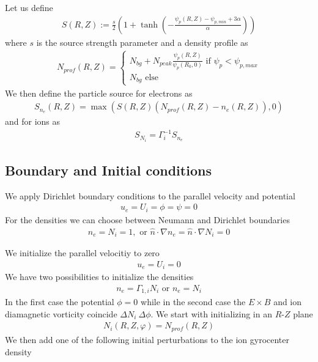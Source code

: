 \documentclass{hitec} %
\begin{document}
Let us define
\begin{align}
  S(R,Z) := \frac{s}{2}\left( 1 + \tanh\left( - \frac{\psi_p(R,Z) - \psi_{p,min} + 3\alpha}{\alpha} \right) \right)
  \label{}
\end{align}
where $s$ is the source strength parameter
and a density profile as
\begin{align}
  N_{prof}(R,Z)=\begin{cases}
    N_{bg} + N_{peak}\frac{\psi_p(R,Z)} {\psi_p(R_0, 0)} \text{ if }\psi_p < \psi_{p,max} \\
    N_{bg} \text{ else }
  \end{cases}
  \label{}
\end{align}
We then define the particle source for electrons as
\begin{align}
  S_{n_e}(R,Z) = \max \left( S(R,Z)(N_{prof}(R,Z) - n_e(R,Z)) , 0\right)
  \label{}
\end{align}
and for ions as
\begin{align}
  S_{N_i} = \Gamma_i^{-1} S_{n_e}
  \label{}
\end{align}

\subsection{Boundary and Initial conditions}
We apply Dirichlet boundary conditions to the parallel velocity and potential
\begin{align}
u_e = U_i = \phi = \psi = 0
\end{align}
For the densities we can choose between Neumann and Dirichlet boundaries
\begin{align}
n_e = N_i = 1, \text{ or } \hat n \cdot \nabla n_e = \hat n \cdot \nabla N_i = 0
\end{align}

We initialize the parallel velocitiy to zero
\begin{align}
  u_e = U_i = 0
  \label{}
\end{align}
We have two possibilities to initialize the densities
\begin{align}
  n_e = \Gamma_{1,i} N_i \text{ or } n_e = N_i
  \label{}
\end{align}
In the first case the potential $\phi= 0$ while in the second case
the $E\times B$ and ion diamagnetic vorticity coincide $\Delta N_i ~ \Delta \phi$.
We start with initializing in an $R$-$Z$ plane
\begin{align}
  N_i(R,Z,\varphi)= N_{prof}(R,Z)
  \label{}
\end{align}
We then add one of the following initial perturbations to the ion gyrocenter density
\end{document}

